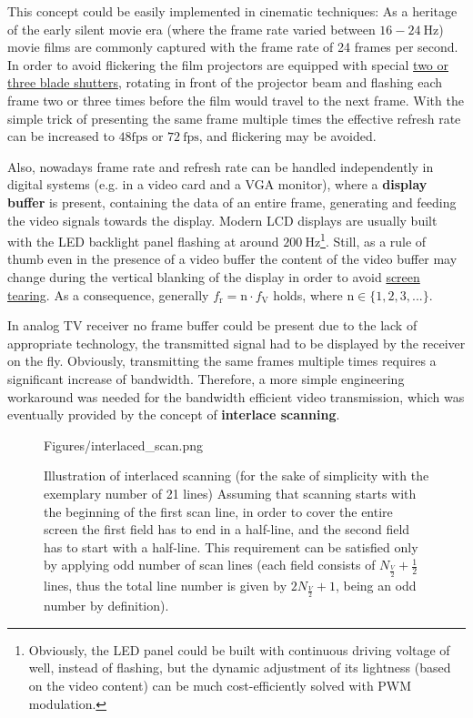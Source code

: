 This concept could be easily implemented in cinematic techniques:
As a heritage of the early silent movie era (where the frame rate varied between $16-24~\mathrm{Hz}$) movie films are commonly captured with the frame rate of 24 frames per second.
In order to avoid flickering the film projectors are equipped with special \href{https://www.youtube.com/watch?v=jrSzRAch930}{two or three blade shutters}, rotating in front of the projector beam and flashing each frame two or three times before the film would travel to the next frame.
With the simple trick of presenting the same frame multiple times the effective refresh rate can be increased to $48\mathrm{fps}$ or $72~\mathrm{fps}$, and flickering may be avoided.

Also, nowadays frame rate and refresh rate can be handled independently in digital systems (e.g. in a video card and a VGA monitor), where a \textbf{display buffer} is present, containing the data of an entire frame, generating and feeding the video signals towards the display.
Modern LCD displays are usually built with the LED backlight panel flashing at around $200~\mathrm{Hz}$\footnote{
Obviously, the LED panel could be built with continuous driving voltage of well, instead of flashing, but the dynamic adjustment of its lightness (based on the video content) can be much cost-efficiently solved with PWM modulation.}.
Still, as a rule of thumb even in the presence of a video buffer the content of the video buffer may change during the vertical blanking of the display in order to avoid \href{https://en.wikipedia.org/wiki/Screen_tearing#/media/File:Tearing_(simulated).jpg}{screen tearing}.
As a consequence, generally $f_{\mathrm{r}} = \mathrm{n} \cdot f_{\mathrm{V}}$ holds, where $\mathrm{n} \in \lbrace 1,2,3,... \rbrace$.

In analog TV receiver no frame buffer could be present due to the lack of appropriate technology, the transmitted signal had to be displayed by the receiver on the fly.
Obviously, transmitting the same frames multiple times requires a significant increase of bandwidth. 
Therefore, a more simple engineering workaround was needed for the bandwidth efficient video transmission, which was eventually provided by the concept of \textbf{interlace scanning}.

\begin{figure}[]
	\centering
	\begin{overpic}[width = 0.85 \columnwidth ]{Figures/interlaced_scan.png}
	\end{overpic}
	\caption{Illustration of interlaced scanning (for the sake of simplicity with the exemplary number of 21 lines)
	Assuming that scanning starts with the beginning of the first scan line, in order to cover the entire screen the first field has to end in a half-line, and the second field has to start with a half-line.
	This requirement can be satisfied only by applying odd number of scan lines (each field consists of $N_{\frac{V}{2}} + \frac{1}{2}$ lines, thus the total line number is given by $2 N_{\frac{V}{2}} + 1$, being an odd number by definition). }
	\label{Fig:interlaced}
\end{figure}

